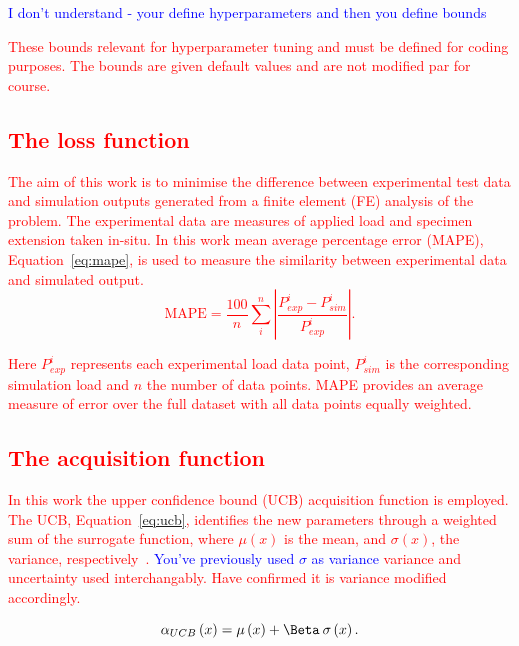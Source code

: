 \documentclass[preprint, review, 12pt]{elsarticle}
\begin{document}
	\textcolor{blue}{I don't understand - your define hyperparameters and then you define bounds}
	\textcolor{red}{These bounds relevant for hyperparameter tuning and must be defined for coding purposes.
	\textcolor{red}{The bounds are given default values and are not modified par for course.}

	\subsection{The loss function}
	\label{h:mape_detailed}

	The aim of this work is to minimise the difference between experimental test data and simulation outputs generated from a finite element (FE) analysis of the problem.
	The experimental data are measures of applied load and specimen extension taken in-situ.
	In this work mean average percentage error (MAPE), Equation~\ref{eq:mape}, is used to measure the similarity between experimental data and simulated output.
 	\begin{equation}
	\text{MAPE} = \frac{100}{n} \sum_i^n \left| \frac{P_{exp}^i - P_{sim}^i}{P_{exp}^i} \right|.
	\label{eq:mape}
	\end{equation}

	Here $P^i_{exp}$ represents each experimental load data point, $P_{sim}^i$ is the corresponding simulation load and $n$ the number of data points.
	MAPE provides an average measure of error over the full dataset with all data points equally weighted.

	\subsection{The acquisition function}
	\label{h:acquisition_function}

	In this work the upper confidence bound (UCB) acquisition function is employed.
	The UCB, Equation~\ref{eq:ucb}, identifies the new parameters through a weighted sum of the surrogate function, where $\mu \left(x \right)$ is the mean, and $\sigma \left(x \right)$, the variance, respectively~\cite{SHAHRIARI2016, DEATH2021}.
	\textcolor{blue}{You've previously used $\sigma$ as variance}
	\textcolor{red}{variance and uncertainty used interchangably. Have confirmed it is variance modified accordingly.}

	\begin{equation}
	\alpha_{UCB} \left( x \right) = \mu \left( x \right) + \Beta \: \sigma\left( x \right).
	\label{eq:ucb}
	\end{equation}

}
\end{document}
